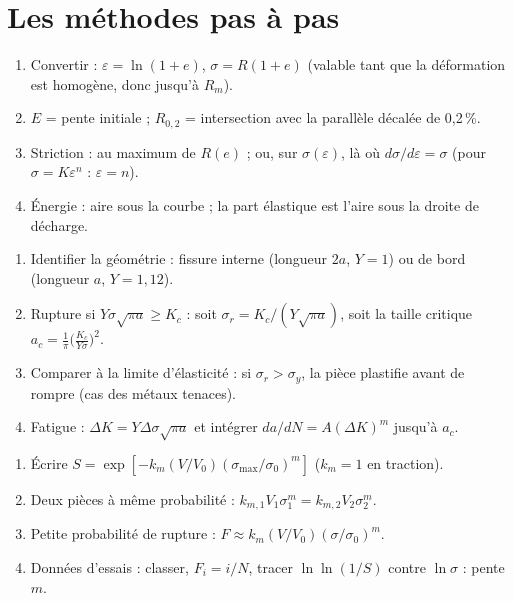 \section{Les méthodes pas à pas}

\begin{exbox}[title={Exploiter une courbe de traction}]
\begin{enumerate}
  \item Convertir : $\varepsilon = \ln(1+e)$, $\sigma = R(1+e)$ (valable tant que la déformation est
        homogène, donc jusqu'à $R_m$).
  \item $E$ = pente initiale ; $R_{0,2}$ = intersection avec la parallèle décalée de 0,2\,\%.
  \item Striction : au maximum de $R(e)$ ; ou, sur $\sigma(\varepsilon)$, là où
        $d\sigma/d\varepsilon = \sigma$ (pour $\sigma = K\varepsilon^n$ : $\varepsilon = n$).
  \item Énergie : aire sous la courbe ; la part élastique est l'aire sous la droite de décharge.
\end{enumerate}
\end{exbox}

\begin{exbox}[title={Problème de rupture}]
\begin{enumerate}
  \item Identifier la géométrie : fissure interne (longueur $2a$, $Y = 1$) ou de bord
        (longueur $a$, $Y = 1{,}12$).
  \item Rupture si $Y\sigma\sqrt{\pi a} \ge K_c$ : soit $\sigma_r = K_c/(Y\sqrt{\pi a})$, soit la
        taille critique $a_c = \frac{1}{\pi}\big(\frac{K_c}{Y\sigma}\big)^2$.
  \item Comparer à la limite d'élasticité : si $\sigma_r > \sigma_y$, la pièce plastifie avant de
        rompre (cas des métaux tenaces).
  \item Fatigue : $\Delta K = Y\Delta\sigma\sqrt{\pi a}$ et intégrer $da/dN = A(\Delta K)^m$ jusqu'à
        $a_c$.
\end{enumerate}
\end{exbox}

\begin{exbox}[title={Problème de Weibull}]
\begin{enumerate}
  \item Écrire $S = \exp[-k_m(V/V_0)(\sigma_{\max}/\sigma_0)^m]$ ($k_m = 1$ en traction).
  \item Deux pièces à même probabilité : $k_{m,1}V_1\sigma_1^m = k_{m,2}V_2\sigma_2^m$.
  \item Petite probabilité de rupture : $F \approx k_m(V/V_0)(\sigma/\sigma_0)^m$.
  \item Données d'essais : classer, $F_i = i/N$, tracer $\ln\ln(1/S)$ contre $\ln\sigma$ :
        pente $m$.
\end{enumerate}
\end{exbox}

